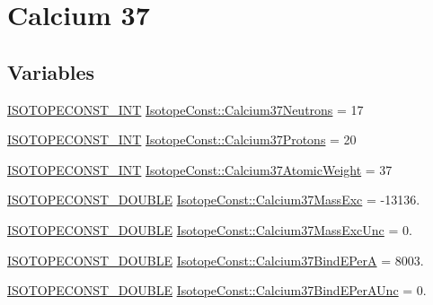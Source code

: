 \hypertarget{group___isotope_const-_calcium-_ca37}{}\section{Calcium 37}
\label{group___isotope_const-_calcium-_ca37}
\subsection*{Variables}
\begin{DoxyCompactItemize}
\item 
\mbox{\hyperlink{group___isotope_const-_macros_ga5f18360b3e99483a35c32d789e62621c}{I\+S\+O\+T\+O\+P\+E\+C\+O\+N\+S\+T\+\_\+\+I\+NT}} \mbox{\hyperlink{group___isotope_const-_calcium-_ca37_gaea0e74223f963072ef58416a4a037bf6}{Isotope\+Const\+::\+Calcium37\+Neutrons}} = 17
\item 
\mbox{\hyperlink{group___isotope_const-_macros_ga5f18360b3e99483a35c32d789e62621c}{I\+S\+O\+T\+O\+P\+E\+C\+O\+N\+S\+T\+\_\+\+I\+NT}} \mbox{\hyperlink{group___isotope_const-_calcium-_ca37_gaa17bf1cc29e912eb840c6ace94cd54f1}{Isotope\+Const\+::\+Calcium37\+Protons}} = 20
\item 
\mbox{\hyperlink{group___isotope_const-_macros_ga5f18360b3e99483a35c32d789e62621c}{I\+S\+O\+T\+O\+P\+E\+C\+O\+N\+S\+T\+\_\+\+I\+NT}} \mbox{\hyperlink{group___isotope_const-_calcium-_ca37_ga560f961144adce3ae5ad65135f4017fa}{Isotope\+Const\+::\+Calcium37\+Atomic\+Weight}} = 37
\item 
\mbox{\hyperlink{group___isotope_const-_macros_ga8f45a7272ce02c0b4c65c44636ed719a}{I\+S\+O\+T\+O\+P\+E\+C\+O\+N\+S\+T\+\_\+\+D\+O\+U\+B\+LE}} \mbox{\hyperlink{group___isotope_const-_calcium-_ca37_ga4c6621353fb25f28d7d4fa3c7e475a0e}{Isotope\+Const\+::\+Calcium37\+Mass\+Exc}} = -\/13136.
\item 
\mbox{\hyperlink{group___isotope_const-_macros_ga8f45a7272ce02c0b4c65c44636ed719a}{I\+S\+O\+T\+O\+P\+E\+C\+O\+N\+S\+T\+\_\+\+D\+O\+U\+B\+LE}} \mbox{\hyperlink{group___isotope_const-_calcium-_ca37_ga112b63f40b219d2e5c1dca583a9d16b3}{Isotope\+Const\+::\+Calcium37\+Mass\+Exc\+Unc}} = 0.
\item 
\mbox{\hyperlink{group___isotope_const-_macros_ga8f45a7272ce02c0b4c65c44636ed719a}{I\+S\+O\+T\+O\+P\+E\+C\+O\+N\+S\+T\+\_\+\+D\+O\+U\+B\+LE}} \mbox{\hyperlink{group___isotope_const-_calcium-_ca37_ga14738891b7d71483bb10b2818cf4365c}{Isotope\+Const\+::\+Calcium37\+Bind\+E\+PerA}} = 8003.
\item 
\mbox{\hyperlink{group___isotope_const-_macros_ga8f45a7272ce02c0b4c65c44636ed719a}{I\+S\+O\+T\+O\+P\+E\+C\+O\+N\+S\+T\+\_\+\+D\+O\+U\+B\+LE}} \mbox{\hyperlink{group___isotope_const-_calcium-_ca37_gaa3ae8bcf274d1a897f75f3f0e24e7789}{Isotope\+Const\+::\+Calcium37\+Bind\+E\+Per\+A\+Unc}} = 0.

\end{DoxyCompactItemize}
